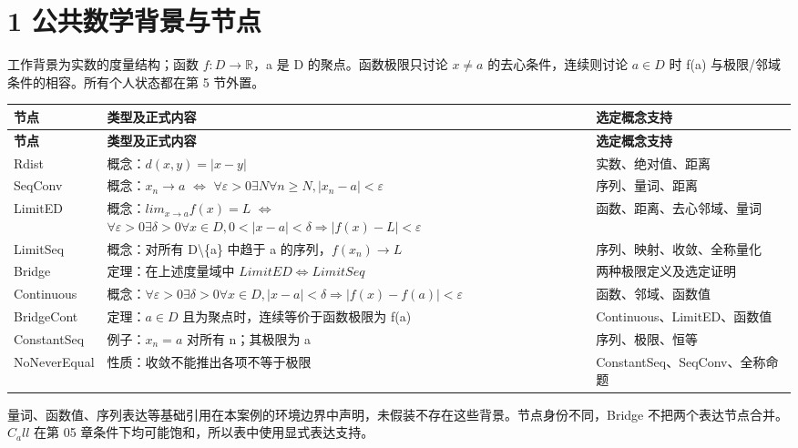 \documentclass[UTF8,a4paper,zihao=-4,fontset=windows,openany]{ctexbook}
\def\mathrm#1{#1}%
\begin{document}
\section{1 公共数学背景与节点}
工作背景为实数的度量结构；函数 \(f:D\to\mathbb{R}\)，a 是 D 的聚点。函数极限只讨论 \(x\ne a\) 的去心条件，连续则讨论 \(a\in D\) 时 f(a) 与极限/邻域条件的相容。所有个人状态都在第 5 节外置。

\begingroup\small\setlength{\tabcolsep}{4pt}
\begin{longtable}{>{\raggedright\arraybackslash}p{}>{\raggedright\arraybackslash}p{}>{\raggedright\arraybackslash}p{}}
\toprule
\textbf{节点} & \textbf{类型及正式内容} & \textbf{选定概念支持} \\
\midrule
\endfirsthead
\toprule
\textbf{节点} & \textbf{类型及正式内容} & \textbf{选定概念支持} \\
\midrule
\endhead
\bottomrule
\endfoot
\bottomrule
\endlastfoot
Rdist & 概念：\(d(x,y)=|x-y|\) & 实数、绝对值、距离 \\
SeqConv & 概念：\(x_n\to a\) \(\Leftrightarrow\) \(\forall\varepsilon>0\exists N\forall n\ge N,|x_n-a|<\varepsilon\) & 序列、量词、距离 \\
LimitED & 概念：\(\mathrm{lim}_{x\to a}f(x)=L\) \(\Leftrightarrow\) \(\forall\varepsilon>0\exists\delta>0\forall x\in D,0<|x-a|<\delta\Rightarrow|f(x)-L|<\varepsilon\) & 函数、距离、去心邻域、量词 \\
LimitSeq & 概念：对所有 D\textbackslash{}\{a\} 中趋于 a 的序列，\(f(x_n)\to L\) & 序列、映射、收敛、全称量化 \\
Bridge & 定理：在上述度量域中 \(\mathrm{LimitED}\Leftrightarrow\mathrm{LimitSeq}\) & 两种极限定义及选定证明 \\
Continuous & 概念：\(\forall\varepsilon>0\exists\delta>0\forall x\in D,|x-a|<\delta\Rightarrow|f(x)-f(a)|<\varepsilon\) & 函数、邻域、函数值 \\
BridgeCont & 定理：\(a\in D\) 且为聚点时，连续等价于函数极限为 f(a) & Continuous、LimitED、函数值 \\
ConstantSeq & 例子：\(x_n=a\) 对所有 n；其极限为 a & 序列、极限、恒等 \\
NoNeverEqual & 性质：收敛不能推出各项不等于极限 & ConstantSeq、SeqConv、全称命题 \\
\end{longtable}
\endgroup

量词、函数值、序列表达等基础引用在本案例的环境边界中声明，未假装不存在这些背景。节点身份不同，Bridge 不把两个表达节点合并。\(C_\mathrm{all}\) 在第 05 章条件下均可能饱和，所以表中使用显式表达支持。
\end{document}

